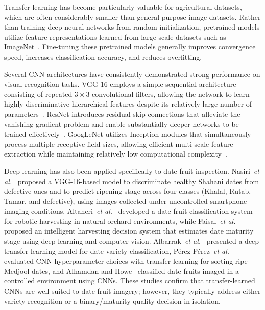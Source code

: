 \documentclass[conference]{IEEEtran}
\begin{document}
Transfer learning has become particularly valuable for agricultural datasets, which are often considerably smaller than general-purpose image datasets. Rather than training deep neural networks from random initialization, pretrained models utilize feature representations learned from large-scale datasets such as ImageNet~\cite{deng2009imagenet}. Fine-tuning these pretrained models generally improves convergence speed, increases classification accuracy, and reduces overfitting.

Several CNN architectures have consistently demonstrated strong performance on visual recognition tasks. VGG-16 employs a simple sequential architecture consisting of repeated $3\times3$ convolutional filters, allowing the network to learn highly discriminative hierarchical features despite its relatively large number of parameters~\cite{simonyan2015vgg}. ResNet introduces residual skip connections that alleviate the vanishing-gradient problem and enable substantially deeper networks to be trained effectively~\cite{he2016resnet}. GoogLeNet utilizes Inception modules that simultaneously process multiple receptive field sizes, allowing efficient multi-scale feature extraction while maintaining relatively low computational complexity~\cite{szegedy2015googlenet}.

Deep learning has also been applied specifically to date fruit inspection. Nasiri~\emph{et al.}~\cite{nasiri2019sorting} proposed a VGG-16-based model to discriminate healthy Shahani dates from defective ones and to predict ripening stage across four classes (Khalal, Rutab, Tamar, and defective), using images collected under uncontrolled smartphone imaging conditions. Altaheri~\emph{et al.}~\cite{altaheri2019robotic} developed a date fruit classification system for robotic harvesting in natural orchard environments, while Faisal~\emph{et al.}~\cite{faisal2020ihds} proposed an intelligent harvesting decision system that estimates date maturity stage using deep learning and computer vision. Albarrak~\emph{et al.}~\cite{albarrak2022model} presented a deep transfer learning model for date variety classification, P\'{e}rez-P\'{e}rez~\emph{et al.}~\cite{perez2021medjool} evaluated CNN hyperparameter choices with transfer learning for sorting ripe Medjool dates, and Alhamdan and Howe~\cite{alhamdan2021controlled} classified date fruits imaged in a controlled environment using CNNs. These studies confirm that transfer-learned CNNs are well suited to date fruit imagery; however, they typically address either variety recognition or a binary/maturity quality decision in isolation.
\end{document}
